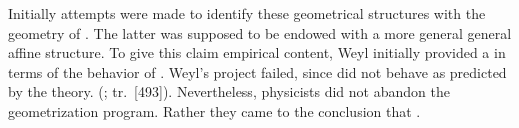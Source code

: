 \documentclass[draft]{article}
\newcommand{\phin}{\ensuremath{\varphi_\nu}\xspace}
\renewcommand{\rzlap}[2]{(\cite[#1]{Reichenbach1928}; tr.\ [#2])\xspace}
\begin{document}


Initially attempts were made to identify these geometrical structures with  the geometry of \spti. The latter was supposed to be endowed with a more general general affine structure. To give this claim empirical content, Weyl initially provided a  in terms of the behavior of \rac. Weyl's project failed, since \rac did not behave as predicted by the theory.   \rzlap{353}{493}. Nevertheless, physicists did not abandon the geometrization program. Rather they came to the conclusion that . 
\end{document}
